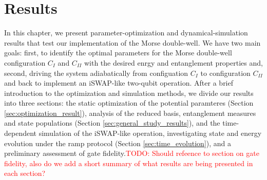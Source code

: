 \documentclass{subfiles}
\begin{document}
\chapter{Results}
In this chapter, we present parameter-optimization and dynamical-simulation results that test our implementation of the Morse double-well. We have two main goals: first, to identify the optimal parameters for the Morse double-well configuration $C_I$ and $C_{II}$ with the desired enrgy and entanglement properties and, second, driving the system adiabatically from configuation $C_I$ to configuration $C_{II}$ and back to implement an iSWAP-like two-qubit operation. After a brief introduction to the optimization and simulation methods, we divide our results into three sections: the static optimization of the potential paramteres (Section \ref{sec:optimization_result}), analysis of the reduced basis, entanglement measures and state populations (Section \ref{sec:general_study_results}), and the time-dependent simulation of the iSWAP-like operation, investigating state and energy evolution under the ramp protocol (Section \ref{sec:time_evolution}), and a preliminary assessment of gate fidelity.\textcolor{red}{TODO: Should refeence to section on gate fidelity, also do we add a short summary of what results are being presented in each section?}
\newpage




\end{document}
